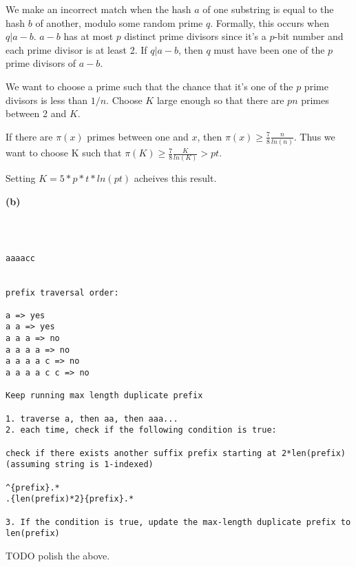 \documentclass[11pt]{article}
\renewcommand{\part}[1] {\vspace{.10in} {\bf (#1)}}
\begin{document}
We make an incorrect match when the hash $a$ of one substring is equal to the hash $b$ of another, modulo some random prime $q$.
Formally, this occurs when $q | a-b$. $a-b$ has at most $p$ distinct prime divisors since it's a $p$-bit number and each prime divisor is at least 2.
If $q | a-b$, then $q$ must have been one of the $p$ prime divisors of $a-b$.

We want to choose a prime such that the chance that it's one of the $p$ prime divisors is less than $1/n$.
Choose $K$ large enough so that there are $pn$ primes between 2 and $K$.

If there are $\pi(x)$ primes between one and $x$, then $\pi(x) \geq \frac{7}{8} \frac{n}{ln(n)}$.
Thus we want to choose K such that
$\pi(K) \geq \frac{7}{8} \frac{K}{ln(K)} > pt$.

Setting $K = 5*p*t*ln(pt)$ acheives this result.




\part{b}

\begin{verbatim}



aaaacc


prefix traversal order:

a => yes
a a => yes
a a a => no
a a a a => no
a a a a c => no
a a a a c c => no

Keep running max length duplicate prefix

1. traverse a, then aa, then aaa...
2. each time, check if the following condition is true:

check if there exists another suffix prefix starting at 2*len(prefix) (assuming string is 1-indexed)

^{prefix}.*
.{len(prefix)*2}{prefix}.*

3. If the condition is true, update the max-length duplicate prefix to len(prefix)

\end{verbatim}

TODO polish the above.
\end{document}
